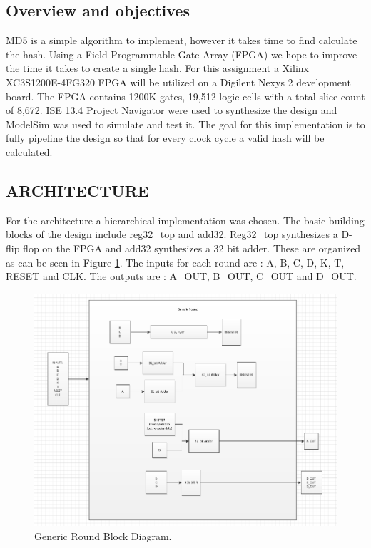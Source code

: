
	\subsection{Overview and objectives}
	
	MD5 is a simple algorithm to implement, however it takes time to find calculate the hash.  Using a Field Programmable Gate Array (FPGA) we hope to improve the time it takes to create a single hash.  For this assignment a Xilinx XC3S1200E-4FG320 FPGA will be utilized on a Digilent Nexys 2 development board.  The FPGA contains 1200K gates, 19,512 logic cells with a total slice count of 8,672.  ISE 13.4 Project Navigator were used to synthesize the design and ModelSim was used to simulate and test it.  The goal for this implementation is to fully pipeline the design so that for every clock cycle a valid hash will be calculated.

	\subsection{ARCHITECTURE}
		For the architecture a hierarchical implementation was chosen.  The basic building blocks of the design include reg32\_top and add32.  Reg32\_top synthesizes a D-flip flop on the FPGA and add32 synthesizes a 32 bit adder.  These are organized as can be seen in Figure \ref{fig:Round}.  The inputs for each round are : A, B, C, D, K, T, RESET and CLK.  The outputs are : A\_OUT, B\_OUT, C\_OUT and D\_OUT.
\begin{figure}[h]
\centering
\includegraphics[width=0.7\linewidth]{./Round}
\caption{Generic Round Block Diagram.}
\label{fig:Round}
\end{figure}

